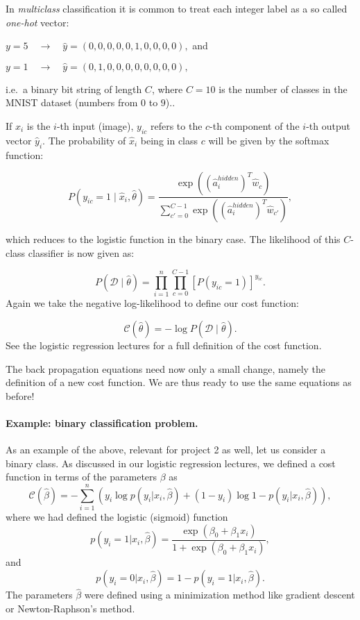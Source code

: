 In \emph{multiclass} classification it is common to treat each integer label as a so called \emph{one-hot} vector:  

$y = 5 \quad \rightarrow \quad \hat{y} = (0, 0, 0, 0, 0, 1, 0, 0, 0, 0) ,$ and

$y = 1 \quad \rightarrow \quad \hat{y} = (0, 1, 0, 0, 0, 0, 0, 0, 0, 0) ,$ 


i.e.~a binary bit string of length $C$, where $C = 10$ is the number of classes in the MNIST dataset (numbers from $0$ to $9$)..  

If $\hat{x}_i$ is the $i$-th input (image), $y_{ic}$ refers to the $c$-th component of the $i$-th
output vector $\hat{y}_i$.  
The probability of $\hat{x}_i$ being in class $c$ will be given by the softmax function:  

\[
P(y_{ic} = 1 \mid \hat{x}_i, \hat{\theta}) = \frac{\exp{((\hat{a}_i^{hidden})^T \hat{w}_c)}}
{\sum_{c'=0}^{C-1} \exp{((\hat{a}_i^{hidden})^T \hat{w}_{c'})}} ,
\]

which reduces to the logistic function in the binary case.  
The likelihood of this $C$-class classifier
is now given as:  

\[
P(\mathcal{D} \mid \hat{\theta}) = \prod_{i=1}^n \prod_{c=0}^{C-1} [P(y_{ic} = 1)]^{y_{ic}} .
\]
Again we take the negative log-likelihood to define our cost function:  

\[
\mathcal{C}(\hat{\theta}) = - \log{P(\mathcal{D} \mid \hat{\theta})}.
\]
See the logistic regression lectures for a full definition of the cost function.

The back propagation equations need now only a small change, namely the definition of a new cost function. We are thus ready to use the same equations as before!

\paragraph{Example: binary classification problem.}
As an example of the above, relevant for project 2 as well, let us consider a binary class. As discussed in our logistic regression lectures, we defined a cost function in terms of the parameters $\beta$ as
\[
\mathcal{C}(\hat{\beta}) = - \sum_{i=1}^n \left(y_i\log{p(y_i \vert x_i,\hat{\beta})}+(1-y_i)\log{1-p(y_i \vert x_i,\hat{\beta})}\right),
\]
where we had defined the logistic (sigmoid) function
\[
p(y_i =1\vert x_i,\hat{\beta})=\frac{\exp{(\beta_0+\beta_1 x_i)}}{1+\exp{(\beta_0+\beta_1 x_i)}},
\]
and
\[
p(y_i =0\vert x_i,\hat{\beta})=1-p(y_i =1\vert x_i,\hat{\beta}).
\]
The parameters $\hat{\beta}$ were defined using a minimization method like gradient descent or Newton-Raphson's method. 

